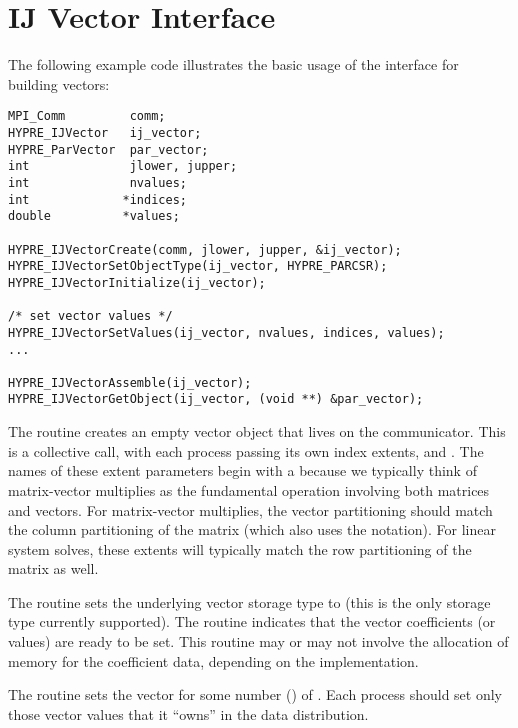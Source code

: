 \section{IJ Vector Interface}

The following example code illustrates the basic usage of the
 interface for building vectors:

\begin{display}
\begin{verbatim}
MPI_Comm         comm;
HYPRE_IJVector   ij_vector;
HYPRE_ParVector  par_vector;
int              jlower, jupper;
int              nvalues;
int             *indices;
double          *values;

HYPRE_IJVectorCreate(comm, jlower, jupper, &ij_vector);
HYPRE_IJVectorSetObjectType(ij_vector, HYPRE_PARCSR);
HYPRE_IJVectorInitialize(ij_vector);

/* set vector values */
HYPRE_IJVectorSetValues(ij_vector, nvalues, indices, values);
...

HYPRE_IJVectorAssemble(ij_vector);
HYPRE_IJVectorGetObject(ij_vector, (void **) &par_vector);

\end{verbatim}
\end{display}
The  routine creates an empty vector object that lives
on the  communicator.  This is a collective call, with each
process passing its own index extents,  and
.  The names of these extent parameters begin with a
 because we typically think of matrix-vector multiplies as
the fundamental operation involving both matrices and vectors.  For
matrix-vector multiplies, the vector partitioning should match the
column partitioning of the matrix (which also uses the 
notation).  For linear system solves, these extents will typically
match the row partitioning of the matrix as well.

The  routine sets the underlying vector storage
type to  (this is the only storage type currently
supported).  The  routine indicates that the vector
coefficients (or values) are ready to be set.  This routine may or may
not involve the allocation of memory for the coefficient data,
depending on the implementation.

The  routine sets the vector  for some
number () of .  Each process should set
only those vector values that it ``owns'' in the data distribution.

